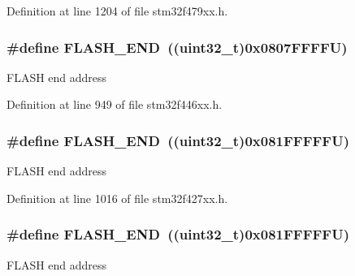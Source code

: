 Definition at line 1204 of file stm32f479xx.\+h.

\subsubsection[{\texorpdfstring{F\+L\+A\+S\+H\+\_\+\+E\+ND}{FLASH_END}}]{\setlength{\rightskip}{0pt plus 5cm}\#define F\+L\+A\+S\+H\+\_\+\+E\+ND~((uint32\+\_\+t)0x0807\+F\+F\+F\+F\+U)}\hypertarget{group___peripheral__memory__map_ga8be554f354e5aa65370f6db63d4f3ee4}{}\label{group___peripheral__memory__map_ga8be554f354e5aa65370f6db63d4f3ee4}
F\+L\+A\+SH end address 

Definition at line 949 of file stm32f446xx.\+h.

\subsubsection[{\texorpdfstring{F\+L\+A\+S\+H\+\_\+\+E\+ND}{FLASH_END}}]{\setlength{\rightskip}{0pt plus 5cm}\#define F\+L\+A\+S\+H\+\_\+\+E\+ND~((uint32\+\_\+t)0x081\+F\+F\+F\+F\+F\+U)}\hypertarget{group___peripheral__memory__map_ga8be554f354e5aa65370f6db63d4f3ee4}{}\label{group___peripheral__memory__map_ga8be554f354e5aa65370f6db63d4f3ee4}
F\+L\+A\+SH end address 

Definition at line 1016 of file stm32f427xx.\+h.

\subsubsection[{\texorpdfstring{F\+L\+A\+S\+H\+\_\+\+E\+ND}{FLASH_END}}]{\setlength{\rightskip}{0pt plus 5cm}\#define F\+L\+A\+S\+H\+\_\+\+E\+ND~((uint32\+\_\+t)0x081\+F\+F\+F\+F\+F\+U)}\hypertarget{group___peripheral__memory__map_ga8be554f354e5aa65370f6db63d4f3ee4}{}\label{group___peripheral__memory__map_ga8be554f354e5aa65370f6db63d4f3ee4}
F\+L\+A\+SH end address 

